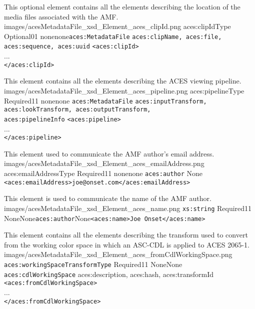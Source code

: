         {This optional element contains all the elements describing the location of the media files associated with the AMF.}
        {images/acesMetadataFile_xsd_Element_aces_clipId.png}
        {aces:clipIdType}
        {Optional}{0}{1}
        {none}{none}{\texttt{aces:MetadataFile}}
        {\texttt{aces:clipName, aces:file, aces:sequence, aces:uuid}}
        {\lstinline{<aces:clipId>} \\
        ... \\
        \lstinline{</aces:clipId>}}        

        {This element contains all the elements describing the ACES viewing pipeline.}
        {images/acesMetadataFile_xsd_Element_aces_pipeline.png}
        {aces:pipelineType}
        {Required}{1}{1}
        {none}{none}
        {\texttt{aces:MetadataFile}}
        {\texttt{aces:inputTransform, aces:lookTransform, aces:outputTransform, \\ aces:pipelineInfo}}
        {\lstinline{<aces:pipeline>} \\
        ... \\
        \lstinline{</aces:pipeline>}}

        {This element used to communicate the AMF author's email address.}
        {images/acesMetadataFile_xsd_Element_aces_emailAddress.png}
        {aces:emailAddressType}
        {Required}{1}{1}
        {none}{none}
        {\texttt{aces:author}}
        {None}
        {\lstinline{<aces:emailAddress>joe@onset.com</aces:emailAddress>}}

        {This element is used to communicate the name of the AMF author.}
        {images/acesMetadataFile_xsd_Element_aces_name.png}
        {\texttt{xs:string}}
        {Required}{1}{1}
        {None}{None}{\texttt{aces:author}}{None}{\lstinline{<aces:name>Joe Onset</aces:name>}}
        
        {This element contains all the elements describing the transform used to convert from the working color space in which an ASC-CDL is applied to ACES 2065-1.}
        {images/acesMetadataFile_xsd_Element_aces_fromCdlWorkingSpace.png}
        {\texttt{aces:workingSpaceTransformType}}
        {Required}{1}{1}
        {None}{None}
        {\texttt{aces:cdlWorkingSpace}}
        {aces:description, aces:hash, aces:transformId}
        {\lstinline{<aces:fromCdlWorkingSpace>} \\
        ... \\
        \lstinline{</aces:fromCdlWorkingSpace>}}

